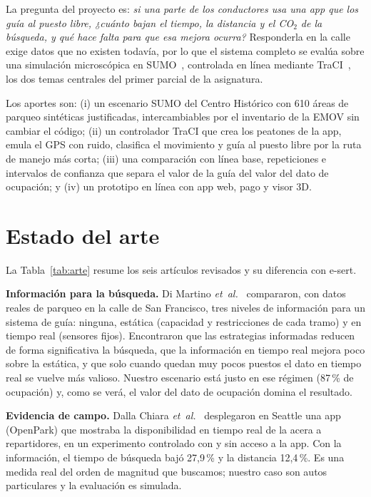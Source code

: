 \documentclass[conference]{IEEEtran}
\begin{document}
La pregunta del proyecto es: \emph{si una parte de los conductores usa una app que los guía al puesto libre, ¿cuánto bajan el tiempo, la distancia y el CO$_2$ de la búsqueda, y qué hace falta para que esa mejora ocurra?} Responderla en la calle exige datos que no existen todavía, por lo que el sistema completo se evalúa sobre una simulación microscópica en SUMO~\cite{lopez2018sumo}, controlada en línea mediante TraCI~\cite{wegener2008traci}, los dos temas centrales del primer parcial de la asignatura.

Los aportes son: (i) un escenario SUMO del Centro Histórico con 610 áreas de parqueo sintéticas justificadas, intercambiables por el inventario de la EMOV sin cambiar el código; (ii) un controlador TraCI que crea los peatones de la app, emula el GPS con ruido, clasifica el movimiento y guía al puesto libre por la ruta de manejo más corta; (iii) una comparación con línea base, repeticiones e intervalos de confianza que separa el valor de la guía del valor del dato de ocupación; y (iv) un prototipo en línea con app web, pago y visor 3D.

\section{Estado del arte}
\label{sec:arte}
La Tabla~\ref{tab:arte} resume los seis artículos revisados y su diferencia con e-sert.

\textbf{Información para la búsqueda.} Di Martino \emph{et~al.}~\cite{dimartino2019comparing} compararon, con datos reales de parqueo en la calle de San Francisco, tres niveles de información para un sistema de guía: ninguna, estática (capacidad y restricciones de cada tramo) y en tiempo real (sensores fijos). Encontraron que las estrategias informadas reducen de forma significativa la búsqueda, que la información en tiempo real mejora poco sobre la estática, y que solo cuando quedan muy pocos puestos el dato en tiempo real se vuelve más valioso. Nuestro escenario está justo en ese régimen (87\,\% de ocupación) y, como se verá, el valor del dato de ocupación domina el resultado.

\textbf{Evidencia de campo.} Dalla Chiara \emph{et~al.}~\cite{dallachiara2022curb} desplegaron en Seattle una app (OpenPark) que mostraba la disponibilidad en tiempo real de la acera a repartidores, en un experimento controlado con y sin acceso a la app. Con la información, el tiempo de búsqueda bajó 27,9\,\% y la distancia 12,4\,\%. Es una medida real del orden de magnitud que buscamos; nuestro caso son autos particulares y la evaluación es simulada.
\end{document}
